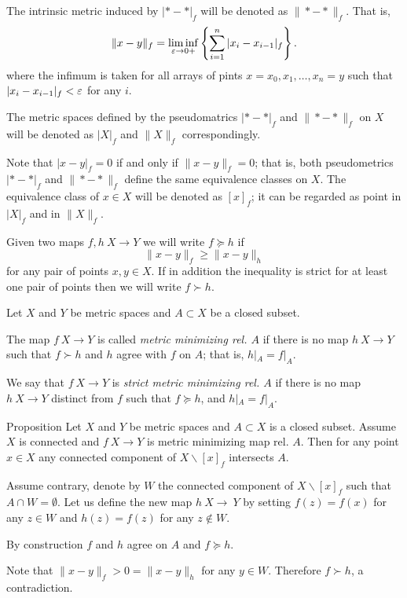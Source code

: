 \documentclass[a4paper,10pt]{amsart}
\begin{document}
The intrinsic metric induced by $|{*}-{*}|_f$ will be denoted as 
$\|{*}-{*}\|_f$. 
That is, 
\[\|x-y\|_f=\liminf_{\varepsilon\to0+}\left\{\sum_{i=1}^n|x_i-x_{i-1}|_f\right\}.\]
where the infimum is taken for all arrays of pints 
$x=x_0,x_1,\dots,x_n=y$ such that 
$|x_i-x_{i-1}|_f<\varepsilon$ for any $i$.

The metric spaces defined by the pseudomatrics $|{*}-{*}|_f$ 
and $\|{*}-{*}\|_f$ on $X$ will be denoted as $|X|_f$ and $\|X\|_f$ correspondingly.

Note that $|x-y|_f=0$ if and only if $\|x-y\|_f=0$;
that is,  both pseudometrics $|{*}-{*}|_f$ and  $\|{*}-{*}\|_f$
define the same equivalence classes on $X$.
The equivalence class of $x\in X$ will be denoted as $[x]_f$; 
it can be regarded as point in  $|X|_f$ and in $\|X\|_f$.

Given two maps $f,h\:X\to Y$ we will write $f\succcurlyeq h$ if 
\[\|x-y\|_f\ge \|x-y\|_h\]
for any pair of points $x,y\in X$.
If in addition the inequality is strict for at least one pair of points then we will write $f\succ h$.

Let $X$ and $Y$ be metric spaces and $A\subset X$ be a closed subset.

The map $f\:X\to Y$ is called \emph{metric minimizing rel. $A$}
if there is no map $h\:X\to Y$ such that $f\succ h$
and $h$ agree with $f$ on $A$;
that is, $h|_A=f|_A$.

We say that $f\:X\to Y$ is \emph{strict metric minimizing rel. $A$}
if there is no map $h\:X\to Y$ distinct from $f$
such that $f\succcurlyeq h$, 
and $h|_A=f|_A$.

\begin{thm}{Proposition}\label{prop:point-complement}
Let $X$ and $Y$ be  metric spaces 
and $A\subset X$ is a closed subset.
Assume $X$ is connected and $f\:X\to Y$ is metric minimizing map rel. $A$.
Then for any point $x\in X$ any connected component of $X\backslash [x]_f$ intersects $A$.

\end{thm}

Assume contrary, denote by $W$ the connected component of $X\backslash [x]_f$ such that $A\cap W=\emptyset$.
Let us define the new map $h\:X\to\ Y$ 
by setting $f(z)=f(x)$ for any $z\in W$
and $h(z)=f(z)$ for any $z\notin W$.

By construction $f$ and $h$ agree on $A$ and $f\succcurlyeq h$.

Note that $\|x-y\|_f>0=\|x-y\|_h$ for any $y\in W$.
Therefore $f\succ h$, a contradiction.
\qeds
\end{document}
